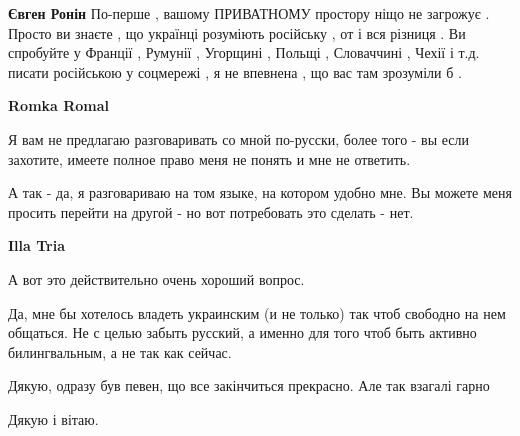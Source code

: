 \begin{itemize}
\begin{itemize}
\textbf{Євген Ронін} По-перше , вашому ПРИВАТНОМУ простору ніщо не загрожує .
Просто ви знаєте , що українці розуміють російську , от і вся різниця . Ви
спробуйте у Франції , Румунії , Угорщині , Польщі , Словаччині , Чехії і т.д.
писати російською у соцмережі , я не впевнена , що вас там зрозуміли б .

 
\textbf{Romka Romal} 

Я вам не предлагаю разговаривать со мной по-русски, более того - вы если
захотите, имеете полное право меня не понять и мне не ответить.

А так - да, я разговариваю на том языке, на котором удобно мне. Вы можете меня
просить перейти на другой - но вот потребовать это сделать - нет.


 
\textbf{Illa Tria} 

А вот это действительно очень хороший вопрос.

Да, мне бы хотелось владеть украинским (и не только) так чтоб свободно на нем
общаться. Не с целью забыть русский, а именно для того чтоб быть активно
билингвальным, а не так как сейчас.

\end{itemize}

 
Дякую, одразу був певен, що все закінчиться прекрасно. Але так взагалі гарно

 
Дякую і вітаю.


\end{itemize}
